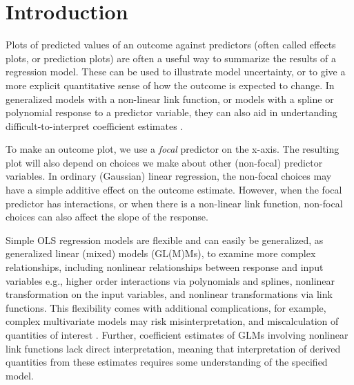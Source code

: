 
\linenumbers

\section{Introduction}

Plots of predicted values of an outcome against predictors (often called effects plots, or prediction plots) are often a useful way to summarize the results of a regression model. These can be used to illustrate model uncertainty, or to give a more explicit quantitative sense of how the outcome is expected to change. In generalized models with a non-linear link function, or models with a spline or polynomial response to a predictor variable, they can also aid in undertanding difficult-to-interpret coefficient estimates \citep{brambor_understanding_2006, berry_improving_2012}. 

To make an outcome plot, we use a \emph{focal} predictor on the x-axis. The resulting plot will also depend on choices we make about other (non-focal) predictor variables. In ordinary (Gaussian) linear regression, the non-focal choices may have a simple additive effect on the outcome estimate. However, when the focal predictor has interactions, or when there is a non-linear link function, non-focal choices can also affect the slope of the response. 

Simple OLS regression models are flexible and can easily be generalized, as generalized linear (mixed) models (GL(M)Ms), to examine more complex relationships, including nonlinear relationships between response and input variables e.g., higher order interactions via polynomials and splines, nonlinear transformation on the input variables, and nonlinear transformations via link functions. This flexibility comes with additional complications, for example, complex multivariate models may risk misinterpretation, and miscalculation of quantities of interest \citep{berry_improving_2012, leeper2017interpreting}. Further, coefficient estimates of GLMs involving nonlinear link functions lack direct interpretation\citep{leeper2017interpreting}, meaning that interpretation of derived quantities from these estimates requires some understanding of the specified model. 

